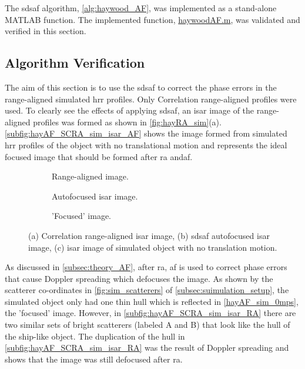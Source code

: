 \documentclass[class=report,11pt,crop=false]{standalone}
\begin{document}
    The \gls{sdsaf} algorithm, \autoref{alg:haywood_AF}, was implemented as a stand-alone \textsc{MATLAB} function. The implemented function, \href{}{haywoodAF.m}, was validated and verified in this section.
    
    \subsection{Algorithm Verification}
    The aim of this section is to use the \gls{sdsaf} to correct the phase errors in the range-aligned simulated \gls{hrr} profiles. Only Correlation range-aligned profiles were used. To clearly see the effects of applying \gls{sdsaf}, an \gls{isar} image of the range-aligned profiles was formed as shown in \autoref{fig:hayRA_sim}(a). \autoref{subfig:hayAF_SCRA_sim_isar_AF} shows the image formed from simulated \gls{hrr} profiles of the object with no translational motion and represents the ideal focused image that should be formed after \gls{ra} and\gls{af}.

    \begin{figure}[h]
        \centering
        \begin{subfigure}{0.3\linewidth}
            \resizebox{\linewidth}{!}{}
            \caption{Range-aligned image. \label{subfig:hayAF_SCRA_sim_isar_RA}}
        \end{subfigure}
        \begin{subfigure}{0.3\linewidth}
            \resizebox{\linewidth}{!}{}
            \caption{Autofocused \gls{isar} image. \label{subfig:hayAF_SCRA_sim_isar_AF}}
        \end{subfigure}
        \begin{subfigure}{0.3\linewidth}
            \resizebox{\linewidth}{!}{}
            \caption{'Focused' image.\label{subfig:hayAF_sim_isar_0mps}}
        \end{subfigure}
        \caption{(a) Correlation range-aligned \gls{isar} image, (b) \gls{sdsaf} autofocused \gls{isar} image, (c) \gls{isar} image of simulated object with no translation motion. \label{fig:hayAF_sim}}
    \end{figure}
    
    As discussed in \autoref{subsec:theory_AF}, after \gls{ra}, \gls{af} is used to correct phase errors that cause Doppler spreading which defocuses the image. As shown by the scatterer co-ordinates in \autoref{fig:sim_scatterers} of \autoref{subsec:suimulation_setup}, the simulated object only had one thin hull which is reflected in \autoref{hayAF_sim_0mps}, the 'focused' image. However, in \autoref{subfig:hayAF_SCRA_sim_isar_RA} there are two similar sets of bright scatterers (labeled A and B) that look like the hull of the ship-like object. The duplication of the hull in \autoref{subfig:hayAF_SCRA_sim_isar_RA} was the result of Doppler spreading and shows that the image was still defocused after \gls{ra}.
\end{document}

